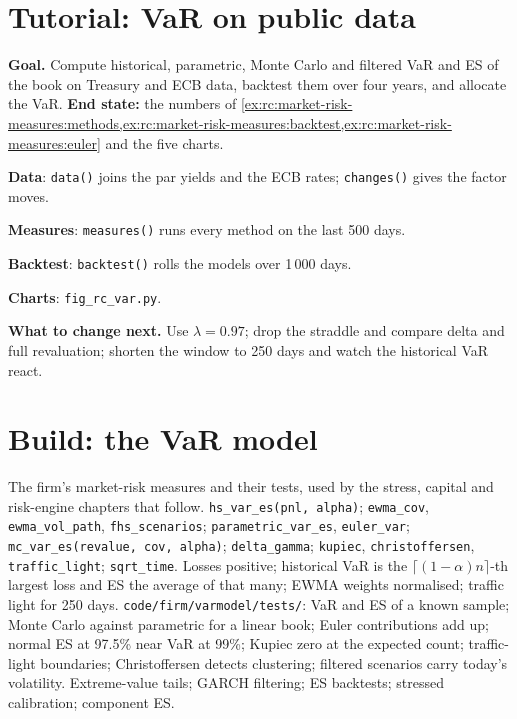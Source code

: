 \section{Tutorial: VaR on public data}\label{tut:rc:market-risk-measures:tutorial}

\begin{tutorial}
\textbf{Goal.} Compute historical, parametric, Monte Carlo and filtered VaR and ES of the book
on Treasury and ECB data, backtest them over four years, and allocate the VaR. \textbf{End state:}
the numbers of
\cref{ex:rc:market-risk-measures:methods,ex:rc:market-risk-measures:backtest,ex:rc:market-risk-measures:euler}
and the five charts.
\begin{tutsteps}
\item \textbf{Data}: \texttt{data()} joins the par yields and the ECB rates; \texttt{changes()}
gives the factor moves.
\item \textbf{Measures}: \texttt{measures()} runs every method on the last 500 days.
\item \textbf{Backtest}: \texttt{backtest()} rolls the models over 1\,000 days.
\item \textbf{Charts}: \texttt{fig\_rc\_var.py}.
\end{tutsteps}
\textbf{What to change next.} Use $\lambda = 0.97$; drop the straddle and compare delta and full
revaluation; shorten the window to 250 days and watch the historical VaR react.
\end{tutorial}

\section{Build: the VaR model}\label{bld:rc:market-risk-measures:varmodel}

\begin{build}
 The firm's market-risk measures and their tests, used by the stress,
capital and risk-engine chapters that follow.
 \texttt{hs\_var\_es(pnl, alpha)}; \texttt{ewma\_cov}, \texttt{ewma\_vol\_path},
\texttt{fhs\_scenarios}; \texttt{parametric\_var\_es}, \texttt{euler\_var}; \texttt{mc\_var\_es(revalue,
cov, alpha)}; \texttt{delta\_gamma}; \texttt{kupiec}, \texttt{christoffersen},
\texttt{traffic\_light}; \texttt{sqrt\_time}.
 Losses positive; historical VaR is the $\lceil(1-\alpha)n\rceil$-th largest loss and ES the
average of that many; EWMA weights normalised; traffic light for 250 days.
 \texttt{code/firm/varmodel/tests/}: VaR and ES of a known sample;
Monte Carlo against parametric for a linear book; Euler contributions add up; normal ES at
97.5\% near VaR at 99\%; Kupiec zero at the expected count; traffic-light boundaries;
Christoffersen detects clustering; filtered scenarios carry today's volatility.
 Extreme-value tails; GARCH filtering; ES backtests; stressed calibration;
component ES.
\end{build}

